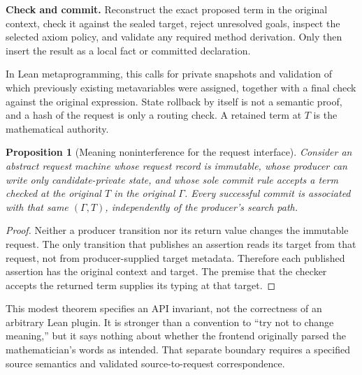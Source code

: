 \documentclass[11pt,letterpaper]{article}
\newtheorem{proposition}[theorem]{Proposition}
\theoremstyle{definition}\newtheorem{definition}[theorem]{Definition}
\theoremstyle{remark}\newtheorem{remark}[theorem]{Remark}
\begin{document}
\textbf{Check and commit.} Reconstruct the exact proposed term in the original
context, check it against the sealed target, reject unresolved goals, inspect
the selected axiom policy, and validate any required method derivation. Only
then insert the result as a local fact or committed declaration.

In Lean metaprogramming, this calls for private snapshots and validation of
which previously existing metavariables were assigned, together with a final
check against the original expression. State rollback by itself is not a
semantic proof, and a hash of the request is only a routing check. A retained
term at $T$ is the mathematical authority.

\begin{proposition}[Meaning noninterference for the request interface]
Consider an abstract request machine whose request record is immutable,
whose producer can write only candidate-private state, and whose sole commit
rule accepts a term checked at the original $T$ in the original $\Gamma$.
Every successful commit is associated with that same $(\Gamma,T)$,
independently of the producer's search path.
\end{proposition}
\begin{proof}
Neither a producer transition nor its return value changes the immutable
request. The only transition that publishes an assertion reads its target
from that request, not from producer-supplied target metadata. Therefore each
published assertion has the original context and target. The premise that the
checker accepts the returned term supplies its typing at that target.
\end{proof}

This modest theorem specifies an API invariant, not the correctness of an
arbitrary Lean plugin. It is stronger than a convention to ``try not to change
meaning,'' but it says nothing about whether the frontend originally parsed
the mathematician's words as intended. That separate boundary requires a
specified source semantics and validated source-to-request correspondence.
\end{document}
